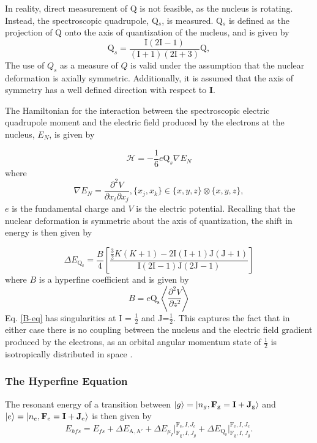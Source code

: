 In reality, direct measurement of Q is not feasible, as the nucleus is rotating. Instead, the spectroscopic quadrupole, Q$_s$, is measured. Q$_s$ is defined as the projection of Q onto the axis of quantization of the nucleus, and is given by
\begin{equation}
\mathrm{Q}_s = \frac{\mathrm{I}(2\mathrm{I}-1)}{(\mathrm{I}+1)(2\mathrm{I}+3)}\mathrm{Q},
\end{equation}
The use of $Q_s$ as a measure of $Q$ is valid under the assumption that the nuclear deformation is axially symmetric. Additionally, it is assumed that the axis of symmetry has a well defined direction with respect to \textbf{I}.

The Hamiltonian for the interaction between the spectroscopic electric quadrupole moment and the electric field produced by the electrons at the nucleus, $E_N$, is given by

\begin{equation}
\mathcal{H} = - \frac{1}{6}e\mathrm{Q}_s\nabla{E_N}
\end{equation}
where
\begin{equation}
\nabla{E_N} = \frac{\partial^2V}{\partial x_i\partial x_j}, \{x_j,x_k\} \in \{x,y,z\} \otimes \{x,y,z\},
\end{equation}
$e$ is the fundamental charge and $V$ is the electric potential. Recalling that the nuclear deformation is symmetric about the axis of quantization, the shift in energy is then given by

\begin{equation}
\Delta E_{\mathrm{Q_s}} = \frac{B}{4}\left[\frac{\frac{3}{2}K(K+1)-2\mathrm{I}(\mathrm{I}+1)\mathrm{J}(\mathrm{J}+1)}{\mathrm{I}(2\mathrm{I}-1)\mathrm{J}(2\mathrm{J}-1)}\right]
\label{B-eq}
\end{equation}
where $B$ is a hyperfine coefficient and is given by
\begin{equation}
B = e\mathrm{Q_s}\left\langle\frac{\partial^2V}{\partial z^2} \right\rangle
\end{equation}
Eq. \ref{B-eq} has singularities at I = $\frac{1}{2}$ and J=$\frac{1}{2}$. This captures the fact that in either case there is no coupling between the nucleus and the electric field gradient produced by the electrons, as an orbital angular momentum state of $\frac{1}{2}$ is isotropically distributed in space .

\subsubsection{The Hyperfine Equation}
The resonant energy of a transition between $\ket{g}=\ket{n_g,\mathrm{\textbf{F}_g=\textbf{I} + \textbf{J}_g}}$ and $\ket{e}=\ket{n_e,\mathrm{\textbf{F}_e=\textbf{I} + \textbf{J}_e}}$ is then given by
\begin{equation}
E_{hfs} = E_{fs} +  \Delta E_{\mathrm{A,A'}}+\Delta E_{\mu_I}\Bigr|_{\mathrm{F_g},I,J_g}^{\mathrm{F_e},I,J_e}+\Delta E_{\mathrm{Q_s}}\Bigr|_{\mathrm{F_g},I,J_g}^{\mathrm{F_e},I,J_e}.
\label{HFE}
\end{equation}

